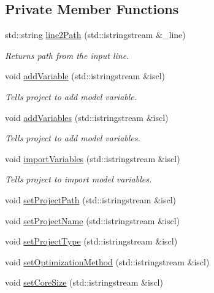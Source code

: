 \subsection*{Private Member Functions}
\begin{DoxyCompactItemize}
\item 
std\-::string \hyperlink{class_go_s_u_m_1_1_c_script_a3745cb775f003334d0db6f160536e0f0}{line2\-Path} (std\-::istringstream \&\-\_\-line)
\begin{DoxyCompactList}\small\item\em Returns path from the input line. \end{DoxyCompactList}\item 
void \hyperlink{class_go_s_u_m_1_1_c_script_a15231a0ddd7b3e7d9ee541eeed255fd1}{add\-Variable} (std\-::istringstream \&iscl)
\begin{DoxyCompactList}\small\item\em Tells project to add model variable. \end{DoxyCompactList}\item 
void \hyperlink{class_go_s_u_m_1_1_c_script_adaf0a3a0757fe6057d219e903a3fa3b6}{add\-Variables} (std\-::istringstream \&iscl)
\begin{DoxyCompactList}\small\item\em Tells project to add model variables. \end{DoxyCompactList}\item 
void \hyperlink{class_go_s_u_m_1_1_c_script_aacd0b6d646b1c912beff0430dd001111}{import\-Variables} (std\-::istringstream \&iscl)
\begin{DoxyCompactList}\small\item\em Tells project to import model variables. \end{DoxyCompactList}\item 
void \hyperlink{class_go_s_u_m_1_1_c_script_a5ccd10b1bac4849d5d433a213c4df583}{set\-Project\-Path} (std\-::istringstream \&iscl)
\item 
void \hyperlink{class_go_s_u_m_1_1_c_script_a6c5347a107096f29ddde5a302c135b75}{set\-Project\-Name} (std\-::istringstream \&iscl)
\item 
void \hyperlink{class_go_s_u_m_1_1_c_script_af017738819ce477a37b6963077187487}{set\-Project\-Type} (std\-::istringstream \&iscl)
\item 
void \hyperlink{class_go_s_u_m_1_1_c_script_a13ba29937c117759a9203d4b3a13606c}{set\-Optimization\-Method} (std\-::istringstream \&iscl)
\item 
void \hyperlink{class_go_s_u_m_1_1_c_script_a5145a840697ab228d2b44f778258ae8f}{set\-Core\-Size} (std\-::istringstream \&iscl)

\end{DoxyCompactItemize}
